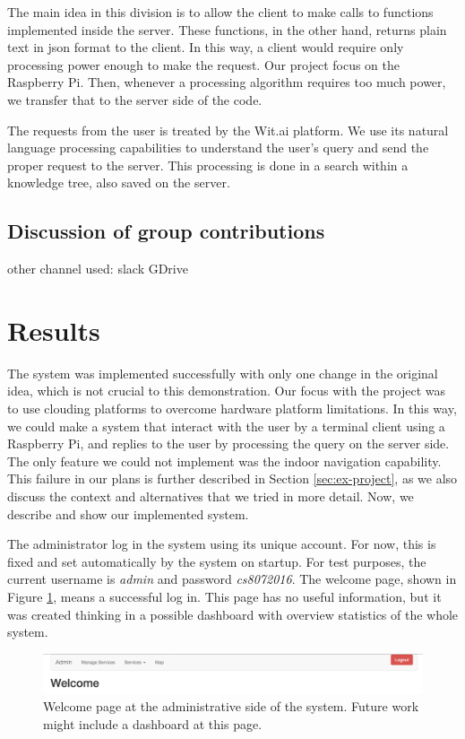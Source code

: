 The main idea in this division is to allow the client to make calls to functions implemented inside the server.
These functions, in the other hand, returns plain text in json format to the client.
In this way, a client would require only processing power enough to make the request.
Our project focus on the Raspberry Pi.
Then, whenever a processing algorithm requires too much power, we transfer that to the server side of the code.

The requests from the user is treated by the Wit.ai platform.
We use its natural language processing capabilities to understand the user's query and send the proper request to the server.
This processing is done in a search within a knowledge tree, also saved on the server.

\subsection{Discussion of group contributions}

other channel used: slack GDrive

\section{Results}

The system was implemented successfully with only one change in the original idea, which is not crucial to this demonstration.
Our focus with the project was to use clouding platforms to overcome hardware platform limitations.
In this way, we could make a system that interact with the user by a terminal client using a Raspberry Pi, and replies to the user by processing the query on the server side.
The only feature we could not implement was the indoor navigation capability.
This failure in our plans is further described in Section \ref{sec:ex-project}, as we also discuss the context and alternatives that we tried in more detail.
Now, we describe and show our implemented system.

The administrator log in the system using its unique account.
For now, this is fixed and set automatically by the system on startup.
For test purposes, the current username is \emph{admin} and password \emph{cs8072016}.
The welcome page, shown in Figure \ref{fig:sys_welcome}, means a successful log in.
This page has no useful information, but it was created thinking in a possible dashboard with overview statistics of the whole system.

\begin{figure}[htbp]
\begin{center}
\includegraphics[width=\textwidth]{figures/welcome.png}
\caption{Welcome page at the administrative side of the system. Future work might include a dashboard at this page.}
\label{fig:sys_welcome}
\end{center}
\end{figure}

